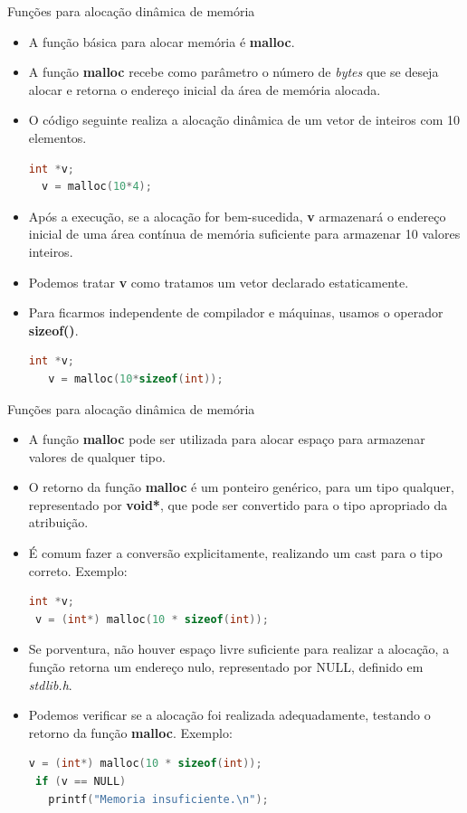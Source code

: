 \begin{frame}{Funções para alocação dinâmica de memória}
  \begin{itemize}[<+->]
    \item A função básica para alocar memória é \textbf{malloc}.
    \item A função \textbf{malloc} recebe como parâmetro o número de \textit{bytes} que se deseja alocar e retorna o endereço inicial da área de memória alocada. 
    \item O código seguinte realiza a alocação dinâmica de um vetor de inteiros com 10 elementos.
\begin{lstlisting}[language=C]
  int *v;
  v = malloc(10*4);
\end{lstlisting}
      \item Após a execução, se a alocação for bem-sucedida, \textbf{v} armazenará o endereço inicial de uma área contínua de memória suficiente para armazenar 10 valores inteiros.
      \item Podemos tratar \textbf{v} como tratamos um vetor declarado estaticamente.
      \item Para ficarmos independente de compilador e máquinas, usamos o operador \textbf{sizeof()}. 
\begin{lstlisting}[language=C]
   int *v;
   v = malloc(10*sizeof(int));
\end{lstlisting}
  \end{itemize}
\end{frame}

\begin{frame}{Funções para alocação dinâmica de memória}  
  \begin{itemize}[<+->]
  \item A função \textbf{malloc} pode ser utilizada para alocar espaço para armazenar valores de qualquer tipo.
  \item O retorno da função \textbf{malloc} é um ponteiro genérico, para um tipo qualquer, representado por \textbf{void*}, que pode ser convertido para o tipo apropriado da atribuição.
  \item É comum fazer a conversão explicitamente, realizando um \alert{cast} para o tipo correto. Exemplo: 
\begin{lstlisting}[language=C]
 int *v;
 v = (int*) malloc(10 * sizeof(int));
\end{lstlisting}
    \item Se porventura, não houver espaço livre suficiente para realizar a alocação, a função retorna um endereço nulo, representado por \alert{NULL}, definido em \textit{stdlib.h}.
    \item Podemos verificar se a alocação foi realizada adequadamente, testando o retorno da função \textbf{malloc}. Exemplo:
\begin{lstlisting}[language=C]
 v = (int*) malloc(10 * sizeof(int));
 if (v == NULL) 
   printf("Memoria insuficiente.\n");
\end{lstlisting}
\end{itemize}
\end{frame}

